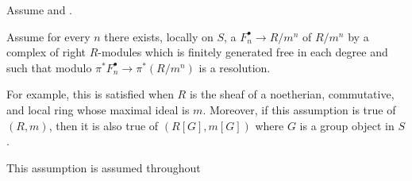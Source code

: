 \begin{context} \label{context:ekedahl_af_nice_resolutions_exist_on_R_mod_m_n} 
    Assume  and . 

    Assume for every $n$ there exists, locally on $S$, a  $F_n^\bullet \to R/m^n$ of $R/m^n$ by a complex of right $R$-modules which is finitely generated free in each degree and such that modulo  $\pi^* F_n^\bullet \to \pi^*(R/m^n)$ is a resolution.

    For example, this is satisfied when $R$ is the  sheaf of a noetherian, commutative, and local ring whose maximal ideal is $m$. Moreover, if this assumption is true of $(R,m)$, then it is also true of $(R[G], m[G])$ where $G$ is a group object in $S$.

    This assumption is assumed throughout \cite{ekedahl_af}
\end{context}